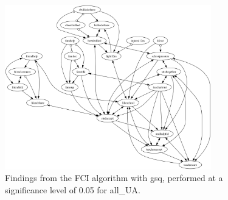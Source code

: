 \begin{figure}[htbp]
    \centering
    \includegraphics[width=0.8\textwidth]{FCI_gsq_0.05_all_UA.png}
    \caption{Findings from the FCI algorithm with gsq, performed at a significance level of 0.05 for all_UA.}
    \label{fig:fci_gsq_0.05all_UA}
\end{figure}
